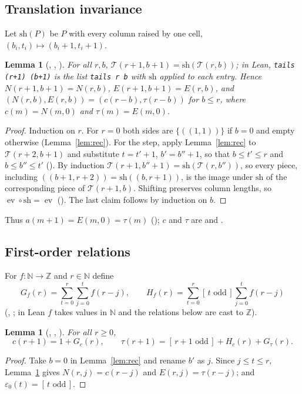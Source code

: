 \documentclass[11pt]{amsart}
\theoremstyle{plain}
\newtheorem{lemma}[theorem]{Lemma}
\theoremstyle{definition}
\newcommand{\N}{\mathbb{N}}
\newcommand{\Z}{\mathbb{Z}}
\newcommand{\ev}{\operatorname{ev}}
\newcommand{\cT}{\mathcal{T}}
\newcommand{\Iv}[1]{[\,#1\,]}
\begin{document}
\subsection{Translation invariance}
Let $\mathrm{sh}(P)$ be $P$ with every column raised by one cell, $(b_i,t_i)\mapsto(b_i+1,t_i+1)$.

\begin{lemma}[, , ]\label{lem:shift}
For all $r,b$, $\cT(r+1,b+1)=\mathrm{sh}(\cT(r,b))$; in Lean, \texttt{tails (r+1) (b+1)} is the list \texttt{tails r b} with $\mathrm{sh}$ applied to each entry. Hence $N(r+1,b+1)=N(r,b)$, $E(r+1,b+1)=E(r,b)$, and $(N(r,b),E(r,b))=(c(r-b),\tau(r-b))$ for $b\le r$, where $c(m)=N(m,0)$ and $\tau(m)=E(m,0)$.
\end{lemma}

\begin{proof}
Induction on $r$. For $r=0$ both sides are $\{((1,1))\}$ if $b=0$ and empty otherwise (Lemma~\ref{lem:rec}). For the step, apply Lemma~\ref{lem:rec} to $\cT(r+2,b+1)$ and substitute $t=t'+1$, $b'=b''+1$, so that $b\le t'\le r$ and $b\le b''\le t'$ (). By induction $\cT(r+1,b''+1)=\mathrm{sh}(\cT(r,b''))$, so every piece, including $((b+1,r+2))=\mathrm{sh}((b,r+1))$, is the image under $\mathrm{sh}$ of the corresponding piece of $\cT(r+1,b)$. Shifting preserves column lengths, so $\ev\circ\mathrm{sh}=\ev$ (). The last claim follows by induction on $b$.
\end{proof}

Thus $a(m+1)=E(m,0)=\tau(m)$ (); $c$ and $\tau$ are  and .

\subsection{First-order relations}
For $f\colon\N\to\Z$ and $r\in\N$ define
\[
  G_f(r)=\sum_{t=0}^{r}\sum_{j=0}^{t}f(r-j),\qquad H_f(r)=\sum_{t=0}^{r}\Iv{t\text{ odd}}\sum_{j=0}^{t}f(r-j)
\]
(, ; in Lean $f$ takes values in $\N$ and the relations below are cast to $\Z$).

\begin{lemma}[, , ]\label{lem:row0}
For all $r\ge0$,
\[
  c(r+1)=1+G_c(r),\qquad \tau(r+1)=\Iv{r+1\text{ odd}}+H_c(r)+G_\tau(r).
\]
\end{lemma}

\begin{proof}
Take $b=0$ in Lemma~\ref{lem:rec} and rename $b'$ as $j$. Since $j\le t\le r$, Lemma~\ref{lem:shift} gives $N(r,j)=c(r-j)$ and $E(r,j)=\tau(r-j)$; and $\varepsilon_0(t)=\Iv{t\text{ odd}}$.
\end{proof}
\end{document}
